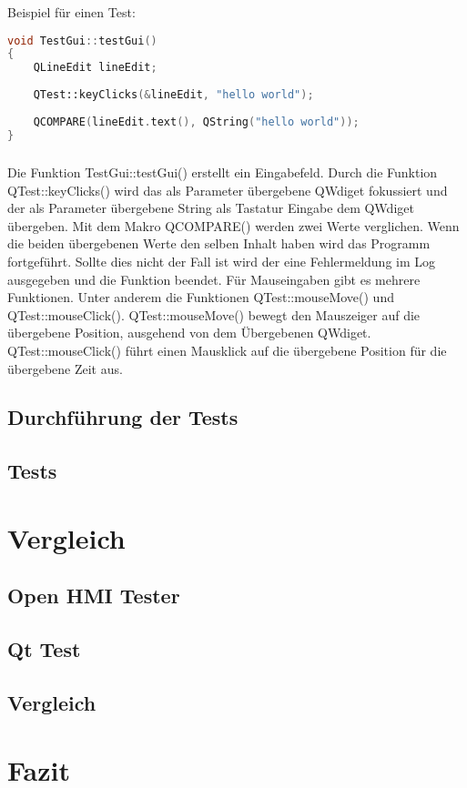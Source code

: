 		Beispiel für einen Test:
		\begin{lstlisting}[language=C++]
void TestGui::testGui()
{
	QLineEdit lineEdit;
	
	QTest::keyClicks(&lineEdit, "hello world");
		
	QCOMPARE(lineEdit.text(), QString("hello world"));
}
		\end{lstlisting}
		\paragraph{} Die Funktion TestGui::testGui() erstellt ein Eingabefeld. Durch die Funktion QTest::keyClicks() wird das als Parameter übergebene QWdiget fokussiert und der als Parameter übergebene String als Tastatur Eingabe dem QWdiget übergeben. Mit dem Makro QCOMPARE() werden zwei Werte verglichen. Wenn die beiden übergebenen Werte den selben Inhalt haben wird das Programm fortgeführt. Sollte dies nicht der Fall ist wird der eine Fehlermeldung im Log ausgegeben und die Funktion beendet. Für Mauseingaben gibt es mehrere Funktionen. Unter anderem die Funktionen QTest::mouseMove() und QTest::mouseClick(). QTest::mouseMove() bewegt den Mauszeiger auf die übergebene Position, ausgehend von dem Übergebenen QWdiget. QTest::mouseClick() führt einen Mausklick auf die übergebene Position für die übergebene Zeit aus.
		
		\section{Durchführung der Tests}
		\section{Tests}
		
\chapter{Vergleich}

	\section{Open HMI Tester}
	\section{Qt Test}
	\section{Vergleich}

\chapter{Fazit}